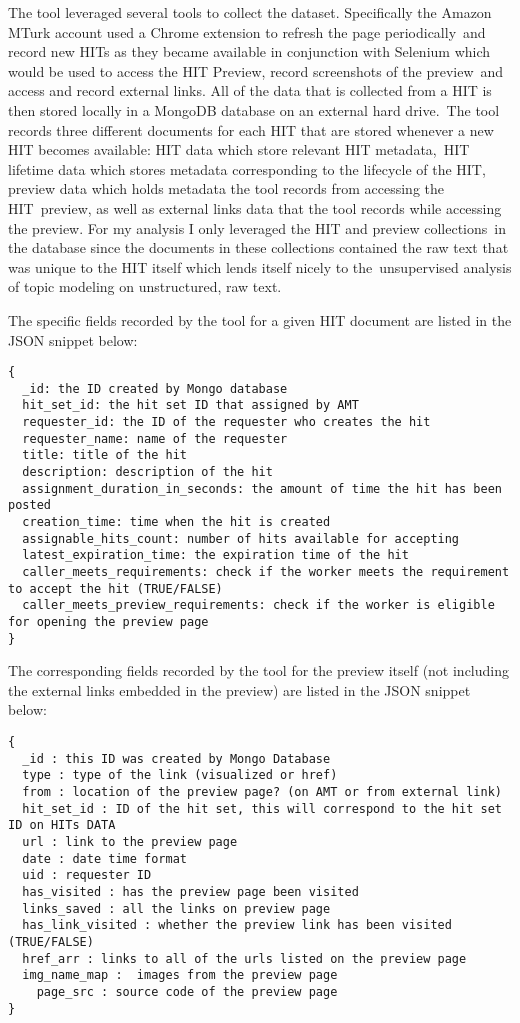 \documentclass[letterpaper,12pt]{article}
\begin{document}
The tool leveraged several tools to collect the dataset. Specifically the Amazon MTurk account used a Chrome extension to refresh the page periodically\
and record new HITs as they became available in conjunction with Selenium which would be used to access the HIT Preview, record screenshots of the preview\
and access and record external links. All of the data that is collected from a HIT is then stored locally in a MongoDB database on an external hard drive.\
The tool records three different documents for each HIT that are stored whenever a new HIT becomes available: HIT data which store relevant HIT metadata,\
HIT lifetime data which stores metadata corresponding to the lifecycle of the HIT, preview data which holds metadata the tool records from accessing the HIT\
preview, as well as external links data that the tool records while accessing the preview. For my analysis I only leveraged the HIT and preview collections\
in the database since the documents in these collections contained the raw text that was unique to the HIT itself which lends itself nicely to the\
unsupervised analysis of topic modeling on unstructured, raw text.

The specific fields recorded by the tool for a given HIT document are listed in the JSON snippet below:

\begin{lstlisting}
{	
  _id: the ID created by Mongo database
  hit_set_id: the hit set ID that assigned by AMT
  requester_id: the ID of the requester who creates the hit
  requester_name: name of the requester
  title: title of the hit
  description: description of the hit
  assignment_duration_in_seconds: the amount of time the hit has been posted
  creation_time: time when the hit is created
  assignable_hits_count: number of hits available for accepting
  latest_expiration_time: the expiration time of the hit
  caller_meets_requirements: check if the worker meets the requirement to accept the hit (TRUE/FALSE)
  caller_meets_preview_requirements: check if the worker is eligible for opening the preview page 
}
\end{lstlisting}

The corresponding fields recorded by the tool for the preview itself (not including the external links embedded in the preview) are listed in the JSON snippet below:\

\begin{lstlisting}
{
  _id : this ID was created by Mongo Database
  type : type of the link (visualized or href)
  from : location of the preview page? (on AMT or from external link)
  hit_set_id : ID of the hit set, this will correspond to the hit set ID on HITs DATA
  url : link to the preview page
  date : date time format
  uid : requester ID
  has_visited : has the preview page been visited
  links_saved : all the links on preview page
  has_link_visited : whether the preview link has been visited (TRUE/FALSE)
  href_arr : links to all of the urls listed on the preview page
  img_name_map :  images from the preview page
	page_src : source code of the preview page
}	
\end{lstlisting}
\end{document}
